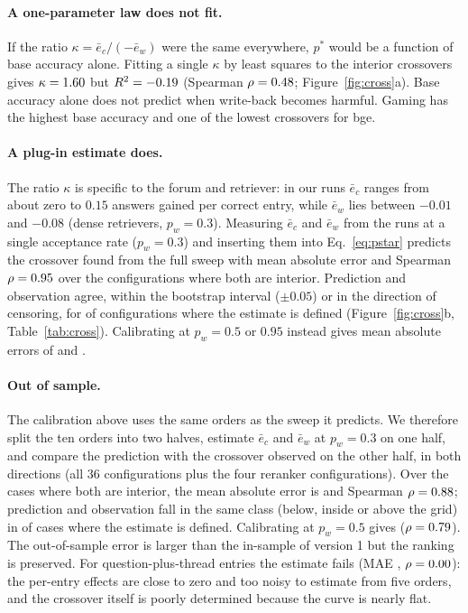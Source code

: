 \documentclass[11pt]{article}
\begin{document}
\paragraph{A one-parameter law does not fit.} If the ratio $\kappa=\bar e_c/(-\bar e_w)$ were the same everywhere, $p^*$ would be a function of base accuracy alone. Fitting a single $\kappa$ by least squares to the \nOne{} interior crossovers gives $\kappa=1.60$ but $R^2=-0.19$ (Spearman $\rho=0.48$; Figure~\ref{fig:cross}a). Base accuracy alone does not predict when write-back becomes harmful. Gaming has the highest base accuracy and one of the lowest crossovers for bge.

\paragraph{A plug-in estimate does.} The ratio $\kappa$ is specific to the forum and retriever: in our runs $\bar e_c$ ranges from about zero to $0.15$ answers gained per correct entry, while $\bar e_w$ lies between $-0.01$ and $-0.08$ (dense retrievers, $p_w=0.3$). Measuring $\bar e_c$ and $\bar e_w$ from the runs at a single acceptance rate ($p_w=0.3$) and inserting them into Eq.~\eqref{eq:pstar} predicts the crossover found from the full sweep with mean absolute error \plugMAE{} and Spearman $\rho=0.95$ over the \plugN{} configurations where both are interior. Prediction and observation agree, within the bootstrap interval ($\pm0.05$) or in the direction of censoring, for \plugAgree{} of \plugTot{} configurations where the estimate is defined (Figure~\ref{fig:cross}b, Table~\ref{tab:cross}). Calibrating at $p_w=0.5$ or $0.95$ instead gives mean absolute errors of \plugMAEfive{} and \plugMAEnn{}. \paragraph{Out of sample.} The calibration above uses the same orders as the sweep it predicts. We therefore split the ten orders into two halves, estimate $\bar e_c$ and $\bar e_w$ at $p_w=0.3$ on one half, and compare the prediction with the crossover observed on the other half, in both directions (all 36 configurations plus the four reranker configurations). Over the \oosNAskTh{} cases where both are interior, the mean absolute error is \oosMAEAskTh{} and Spearman $\rho=0.88$; prediction and observation fall in the same class (below, inside or above the grid) in \oosSameAskTh{} of \oosDefAskTh{} cases where the estimate is defined. Calibrating at $p_w=0.5$ gives \oosMAEAskFi{} ($\rho=0.79$). The out-of-sample error is larger than the in-sample \plugMAE{} of version 1 but the ranking is preserved. For question-plus-thread entries the estimate fails (MAE \oosMAEAskdocTh, $\rho=0.00$): the per-entry effects are close to zero and too noisy to estimate from five orders, and the crossover itself is poorly determined because the curve is nearly flat.
\end{document}
